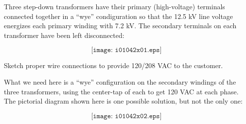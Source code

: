 

Three step-down transformers have their primary (high-voltage) terminals connected together in a ``wye'' condiguration so that the 12.5 kV line voltage energizes each primary winding with 7.2 kV.  The secondary terminals on each transformer have been left disconnected:

$$\texttt{[image: i01042x01.eps]}$$

Sketch proper wire connections to provide 120/208 VAC to the customer.







What we need here is a ``wye'' configuration on the secondary windings of the three transformers, using the center-tap of each to get 120 VAC at each phase.  The pictorial diagram shown here is one possible solution, but not the only one:

$$\texttt{[image: i01042x02.eps]}$$












